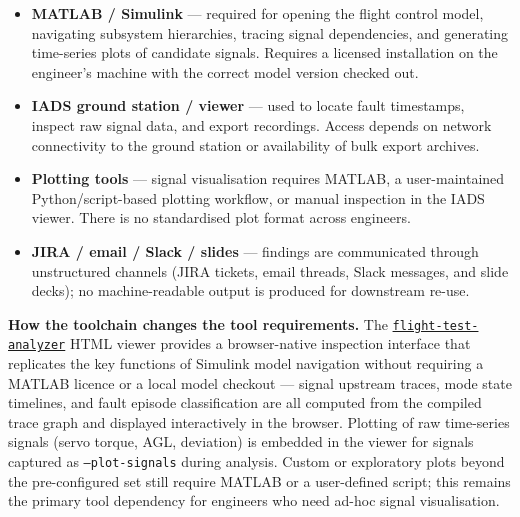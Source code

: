 \documentclass[11pt, letterpaper]{article}
\newcommand{\repoFTA}{\href{https://github.com/francis-barchesky/flight-test-analyzer}{\texttt{flight-test-analyzer}}}
\begin{document}
\begin{itemize}[leftmargin=1.6em, itemsep=3pt, topsep=4pt]
  \item \textbf{MATLAB / Simulink} --- required for opening the flight control
    model, navigating subsystem hierarchies, tracing signal dependencies, and
    generating time-series plots of candidate signals. Requires a licensed
    installation on the engineer's machine with the correct model version
    checked out.
  \item \textbf{IADS ground station / viewer} --- used to locate fault
    timestamps, inspect raw signal data, and export recordings. Access depends
    on network connectivity to the ground station or availability of bulk
    export archives.
  \item \textbf{Plotting tools} --- signal visualisation requires MATLAB,
    a user-maintained Python/script-based plotting workflow, or manual
    inspection in the IADS viewer. There is no standardised plot format across
    engineers.
  \item \textbf{JIRA / email / Slack / slides} --- findings are communicated
    through unstructured channels (JIRA tickets, email threads, Slack messages,
    and slide decks); no machine-readable output is produced for downstream
    re-use.
\end{itemize}

\medskip
\noindent\textbf{How the toolchain changes the tool requirements.}\quad
The \repoFTA{} HTML viewer provides a browser-native inspection interface that
replicates the key functions of Simulink model navigation without requiring a
MATLAB licence or a local model checkout --- signal upstream traces, mode
state timelines, and fault episode classification are all computed from the
compiled trace graph and displayed interactively in the browser. Plotting of
raw time-series signals (servo torque, AGL, deviation) is embedded in the
viewer for signals captured as \texttt{--plot-signals} during analysis.
Custom or exploratory plots beyond the pre-configured set still require MATLAB
or a user-defined script; this remains the primary tool dependency for
engineers who need ad-hoc signal visualisation.

\medskip
\end{document}
